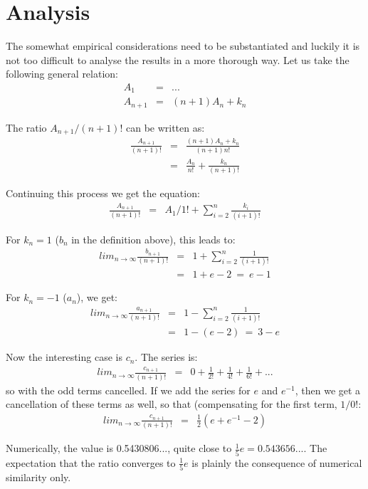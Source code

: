 \documentclass[onecolumn]{article}
\begin{document}
\section*{Analysis}
The somewhat empirical considerations need to be substantiated and luckily it is not too difficult to
analyse the results in a more thorough way. Let us take the following general relation:
\begin{eqnarray}
    A_1 &=& ... \\
    A_{n+1} &=& (n+1) A_n + k_n
\end{eqnarray}

The ratio $A_{n+1} / (n+1)!$ can be written as:
\begin{eqnarray}
    \frac{A_{n+1}}{(n+1)!} &=& \frac{(n+1) A_n + k_n}{(n+1) n!} \\
                           &=& \frac{A_n}{n!} + \frac{k_n}{(n+1)!}
\end{eqnarray}

Continuing this process we get the equation:
\begin{eqnarray}
    \frac{A_{n+1}}{(n+1)!} &=& A_1/1! + \sum_{i=2}^n \frac{k_i}{(i+1)!}
\end{eqnarray}

For $k_n = 1$ ($b_n$ in the definition above), this leads to:
\begin{eqnarray}
    lim_{n \rightarrow \infty} \frac{b_{n+1}}{(n+1)!} &=& 1 + \sum_{i=2}^n \frac{1}{(i+1)!} \\
                                                     &=& 1 + e-2 ~=~ e-1
\end{eqnarray}

For $k_n = -1$ ($a_n$), we get:
\begin{eqnarray}
    lim_{n \rightarrow \infty} \frac{a_{n+1}}{(n+1)!} &=& 1 - \sum_{i=2}^n \frac{1}{(i+1)!} \\
                                                      &=& 1 - (e-2) ~=~ 3 - e
\end{eqnarray}

Now the interesting case is $c_n$. The series is:
\begin{eqnarray}
    lim_{n \rightarrow \infty} \frac{c_{n+1}}{(n+1)!} &=& 0 + \frac{1}{2!} + \frac{1}{4!} + \frac{1}{6!} + ...
\end{eqnarray}
\noindent so with the odd terms cancelled. If we add the series for $e$ and $e^{-1}$, then we get a cancellation
of these terms as well, so that (compensating for the first term, $1/0!$:
\begin{eqnarray}
    lim_{n \rightarrow \infty} \frac{c_{n+1}}{(n+1)!} &=& \frac{1}{2} \left(e + e^{-1} - 2 \right)
\end{eqnarray}

Numerically, the value is 0.5430806..., quite close to $\frac{1}{5} e = 0.543656...$. The expectation that the
ratio converges to $\frac{1}{5} e$ is plainly the consequence of numerical similarity only.
\end{document}
